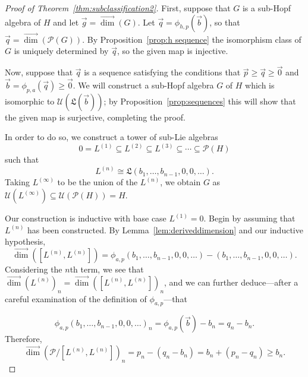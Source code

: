 \documentclass[11pt]{amsart}
\theoremstyle{definition}
\numberwithin{equation}{section}
\begin{document}
\begin{proof}[Proof of Theorem~\ref{thm:subclassification2}]
First, suppose that $G$ is a sub-Hopf algebra of $H$ and let $\vec{g} = \vec{\dim}(G)$.  Let $\vec{q} = \phi_{h, p}(\vec{b})$, so that $\vec{q} = \vec{\dim}(\mathcal{P}(G))$.  By Proposition~\ref{prop:h sequence} the isomorphism class of $G$ is uniquely determined by $\vec{q}$, so the given map is injective.

Now, suppose that $\vec{q}$ is a sequence satisfying the conditions that $\vec{p} \ge \vec{q} \ge \vec{0}$ and $\vec{b} = \phi_{p, a}(\vec{q}) \ge \vec{0}$.  
We will construct a sub-Hopf algebra $G$ of $H$ which is isomorphic to $\mathcal{U}(\mathfrak{L}(\vec{b}))$; by Proposition~\ref{prop:sequences} this will show that the given map is surjective, completing the proof.  

In order to do so, we construct a tower of sub-Lie algebras 
\[
0 = L^{(1)} \subseteq L^{(2)} \subseteq L^{(3)} \subseteq \cdots \subseteq \mathcal{P}(H)
\]
such that 
\[
L^{(n)} \cong \mathfrak{L}(b_{1}, \ldots, b_{n-1}, 0, 0, \ldots).
\]
Taking $L^{(\infty)}$ to be the union of the $L^{(n)}$, we obtain $G$ as $\mathcal{U}(L^{(\infty)}) \subseteq \mathcal{U}(\mathcal{P}(H)) = H$.

Our construction is inductive with base case $L^{(1)} = 0$.  
Begin by assuming that $L^{(n)}$ has been constructed.  
By Lemma~\ref{lem:deriveddimension} and our inductive hypothesis,
\[
\vec{\dim}([L^{(n)}, L^{(n)}])%
 = 
\phi_{a, p}(b_{1}, \ldots, b_{n-1}, 0, 0, \ldots) - (b_{1}, \ldots, b_{n-1}, 0, 0, \ldots).
\]
Considering the $n$th term, we see that $\vec{\dim}(L^{(n)})_{n} = \vec{\dim}([L^{(n)}, L^{(n)}])_{n}$, and we can further deduce---after a careful examination of the definition of $\phi_{a, p}$---that

\begin{equation}
\label{eq:inductivedimensionequality}
\phi_{a, p}(b_{1}, \ldots, b_{n-1}, 0, 0, \ldots)_{n}
=
\phi_{a, p}(\vec{b}) - b_{n}
=
q_{n} - b_{n}.
\end{equation}
Therefore,
\[
\vec{\dim}\left( \mathcal{P} \big/ [L^{(n)}, L^{(n)}] \right)_{n}
= p_{n} - (q_{n} - b_{n})
= b_{n} + (p_{n} - q_{n})
\ge b_{n}.
\]


\end{proof}
\end{document}
